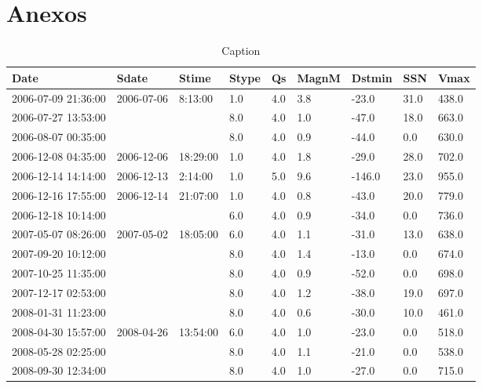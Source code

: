 \newpage
\chapter{Anexos}

\begin{longtable}{lllllllll}
\caption{Caption} \\
\toprule
\textbf{Date} & \textbf{Sdate} & \textbf{Stime} & \textbf{Stype} & \textbf{Qs} & \textbf{MagnM} & \textbf{Dstmin} & \textbf{SSN} & \textbf{Vmax} \\ 
\midrule
\endhead
2006-07-09 21:36:00 & 2006-07-06 & 8:13:00 & 1.0 & 4.0 & 3.8 & -23.0 & 31.0 & 438.0 \\ 
        2006-07-27 13:53:00 & ~ & ~ & 8.0 & 4.0 & 1.0 & -47.0 & 18.0 & 663.0 \\ 
        2006-08-07 00:35:00 & ~ & ~ & 8.0 & 4.0 & 0.9 & -44.0 & 0.0 & 630.0 \\ 
        2006-12-08 04:35:00 & 2006-12-06 & 18:29:00 & 1.0 & 4.0 & 1.8 & -29.0 & 28.0 & 702.0 \\ 
        2006-12-14 14:14:00 & 2006-12-13 & 2:14:00 & 1.0 & 5.0 & 9.6 & -146.0 & 23.0 & 955.0 \\ 
        2006-12-16 17:55:00 & 2006-12-14 & 21:07:00 & 1.0 & 4.0 & 0.8 & -43.0 & 20.0 & 779.0 \\ 
        2006-12-18 10:14:00 & ~ & ~ & 6.0 & 4.0 & 0.9 & -34.0 & 0.0 & 736.0 \\ 
        2007-05-07 08:26:00 & 2007-05-02 & 18:05:00 & 6.0 & 4.0 & 1.1 & -31.0 & 13.0 & 638.0 \\ 
        2007-09-20 10:12:00 & ~ & ~ & 8.0 & 4.0 & 1.4 & -13.0 & 0.0 & 674.0 \\ 
        2007-10-25 11:35:00 & ~ & ~ & 8.0 & 4.0 & 0.9 & -52.0 & 0.0 & 698.0 \\ 
        2007-12-17 02:53:00 & ~ & ~ & 8.0 & 4.0 & 1.2 & -38.0 & 19.0 & 697.0 \\ 
        2008-01-31 11:23:00 & ~ & ~ & 8.0 & 4.0 & 0.6 & -30.0 & 10.0 & 461.0 \\ 
        2008-04-30 15:57:00 & 2008-04-26 & 13:54:00 & 6.0 & 4.0 & 1.0 & -23.0 & 0.0 & 518.0 \\ 
        2008-05-28 02:25:00 & ~ & ~ & 8.0 & 4.0 & 1.1 & -21.0 & 0.0 & 538.0 \\ 
        2008-09-30 12:34:00 & ~ & ~ & 8.0 & 4.0 & 1.0 & -27.0 & 0.0 & 715.0 \\ 

\end{longtable}
